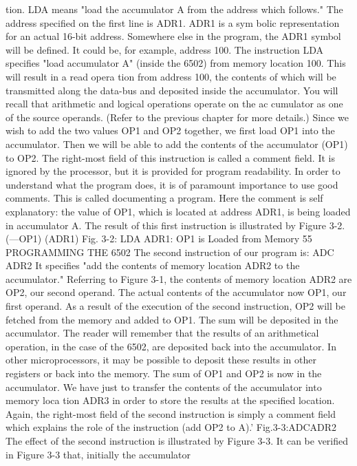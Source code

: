 tion. LDA means "load the accumulator A from the address which
follows."
The address specified on the first line is ADR1. ADR1 is a sym
bolic representation for an actual 16-bit address. Somewhere else
in the program, the ADR1 symbol will be defined. It could be, for
example, address 100.
The instruction LDA specifies "load accumulator A" (inside the
6502) from memory location 100. This will result in a read opera
tion from address 100, the contents of which will be transmitted
along the data-bus and deposited inside the accumulator. You
will recall that arithmetic and logical operations operate on the ac
cumulator as one of the source operands. (Refer to the previous
chapter for more details.) Since we wish to add the two values
OP1 and OP2 together, we first load OP1 into the accumulator.
Then we will be able to add the contents of the accumulator (OP1)
to OP2.
The right-most field of this instruction is called a comment field.
It is ignored by the processor, but it is provided for program
readability. In order to understand what the program does, it is of
paramount importance to use good comments.
This is called documenting a program. Here the comment is self
explanatory: the value of OP1, which is located at address ADR1,
is being loaded in accumulator A.
The result of this first instruction is illustrated by Figure 3-2.
(—OP1)
(ADR1)
Fig. 3-2: LDA ADR1: OP1 is Loaded from Memory
55
PROGRAMMING THE 6502
The second instruction of our program is:
ADC ADR2
It specifies "add the contents of memory location ADR2 to the
accumulator." Referring to Figure 3-1, the contents of memory
location ADR2 are OP2, our second operand. The actual contents of
the accumulator now OP1, our first operand. As a result of the
execution of the second instruction, OP2 will be fetched from the
memory and added to OP1. The sum will be deposited in the
accumulator. The reader will remember that the results of an
arithmetical operation, in the case of the 6502, are deposited back
into the accumulator. In other microprocessors, it may be possible
to deposit these results in other registers or back into the memory.
The sum of OP1 and OP2 is now in the accumulator. We have
just to transfer the contents of the accumulator into memory loca
tion ADR3 in order to store the results at the specified location.
Again, the right-most field of the second instruction is simply a
comment field which explains the role of the instruction (add OP2
to A).'
Fig.3-3:ADCADR2
The effect of the second instruction is illustrated by Figure 3-3.
It can be verified in Figure 3-3 that, initially the accumulator
